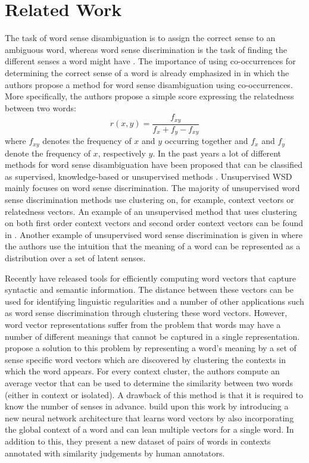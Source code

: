\documentclass[11pt]{article}
\begin{document}
\section{Related Work}
The task of word sense disambiguation is to assign the correct sense to an ambiguous word, whereas word sense discrimination is the task of finding the different senses a word might have \cite{old}. The importance of using co-occurrences for determining the correct sense of a word is already emphasized in \cite{relatedness} in which the authors propose a method for word sense disambiguation using co-occurrences. More specifically, the authors propose a simple score expressing the relatedness between two words:
\begin{equation}\label{r}r(x, y) = \frac{f_{xy}}{f_x+f_y - f_{xy}}\end{equation}
where $f_{xy}$ denotes the frequency of $x$ and $y$ occurring together and $f_x$ and $f_y$ denote the frequency of $x$, respectively $y$. 
In the past years a lot of different methods for word sense disambiguation have been proposed that can be classified as supervised, knowledge-based or unsupervised methods \cite{survey}. Unsupervised WSD mainly focuses on word sense discrimination. The majority of unsupervised word sense discrimination methods use clustering on, for example, context vectors or relatedness vectors. An example of an unsupervised method that uses clustering on both first order context vectors and second order context vectors can be found in \cite{clustering}. Another example of unsupervised word sense discrimination is given in \cite{latent} where the authors use the intuition that the meaning of a word can be represented as a distribution over a set of latent senses.


Recently \cite{word2vec} have released tools for efficiently computing word vectors that capture syntactic and semantic information. The distance between these vectors can be used for identifying linguistic regularities \cite{regularities} and a number of other applications such as word sense discrimination through clustering these word vectors. However, word vector representations suffer from the problem that words may have a number of different meanings that cannot be captured in a single representation. \cite{multi} propose a solution to this problem by representing a word's meaning by a set of sense specific word vectors which are discovered by clustering the contexts in which the word appears. For every context cluster, the authors compute an average vector that can be used to determine the similarity between two words (either in context or isolated). A drawback of this method is that it is required to know the number of senses in advance. \cite{global} build upon this work by introducing a new neural network architecture that learns word vectors by also incorporating the global context of a word and can lean multiple vectors for a single word. In addition to this, they present a new dataset of pairs of words in contexts annotated with similarity judgements by human annotators. 
\end{document}
